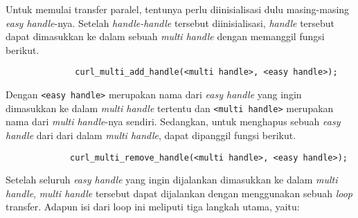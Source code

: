 Untuk memulai transfer paralel, tentunya perlu diinisialisasi dulu masing-masing \textit{easy handle}-nya. Setelah \textit{handle-handle} tersebut diinisialisasi, \textit{handle} tersebut dapat dimasukkan ke dalam sebuah \textit{multi handle} dengan memanggil fungsi berikut.

\begin{verbatim}
              curl_multi_add_handle(<multi handle>, <easy handle>);
\end{verbatim}
\noindent
Dengan \verb|<easy handle>| merupakan nama dari \textit{easy handle} yang ingin dimasukkan ke dalam \textit{multi handle} tertentu dan \verb|<multi handle>| merupakan nama dari \textit{multi handle}-nya sendiri. Sedangkan, untuk menghapus sebuah \textit{easy handle} dari dari dalam \textit{multi handle}, dapat dipanggil fungsi berikut.

\begin{verbatim}
             curl_multi_remove_handle(<multi handle>, <easy handle>);
\end{verbatim}

Setelah seluruh \textit{easy handle} yang ingin dijalankan dimasukkan ke dalam \textit{multi handle}, \textit{multi handle} tersebut dapat dijalankan dengan menggunakan sebuah \textit{loop} transfer. Adapun isi dari loop ini meliputi tiga langkah utama, yaitu:

